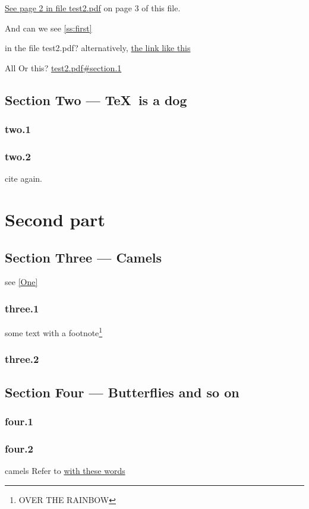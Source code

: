 \documentclass[11pt]{book}
\begin{document}
\href{file:test2.pdf#page.2}{See page 2 in file test2.pdf} 
on page 3 of this file.

And can we  see \autoref{ss:first}

in the file test2.pdf? alternatively,
\href{file:test2.pdf#subsection.1.2}{the link like this}

All Or this? \url{test2.pdf#section.1}

\newpage
\section{Section Two --- \TeX\ is a dog}
\subsection{two.1}
\subsection{two.2}
\newpage
cite \cite{Barcelo:1992:caa} again.

\chapter{Second part}
\section{Section Three --- Camels}\label{Three}
see \autoref{One}
\subsection{three.1}
 some text with a footnote\footnote{OVER THE RAINBOW}
\subsection{three.2}

\newpage
\section[Section Four --- Butterflies]{Section Four --- Butterflies and so on}
\subsection{four.1}
\subsection{four.2}
camels
Refer to \hyperref{}{test}{test1}{with these words}
\newpage
\end{document}
